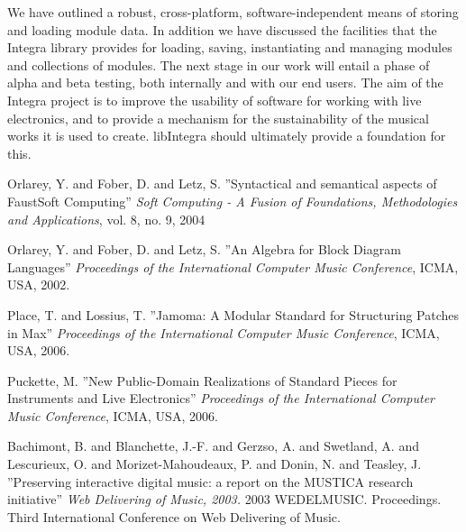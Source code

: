 \documentclass{article}
\begin{document}
We have outlined a robust, cross-platform, software-independent means of storing and loading module data. In addition we have discussed the facilities that the Integra library provides for loading, saving, instantiating and managing modules and collections of modules. The next stage in our work will entail a phase of alpha and beta testing, both internally and with our end users. The aim of the Integra project is to improve the usability of software for working with live electronics, and to provide a mechanism for the sustainability of the musical works it is used to create. libIntegra should ultimately provide a foundation for this.

\begin{thebibliography}{citations}

 Orlarey, Y. and Fober, D. and Letz, S.
''Syntactical and semantical aspects of FaustSoft Computing''
{\it Soft Computing - A Fusion of Foundations, Methodologies and Applications}, vol. 8, no. 9, 2004

 Orlarey, Y. and Fober, D. and Letz, S.
''An Algebra for Block Diagram Languages''
{\it Proceedings of the International Computer Music Conference}, ICMA, USA, 2002.

 Place, T. and Lossius, T.
''Jamoma: A Modular Standard for Structuring Patches in Max''
{\it Proceedings of the International Computer Music Conference}, ICMA, USA, 2006.

 Puckette, M.
''New Public-Domain Realizations of Standard Pieces for Instruments and
Live Electronics''
{\it Proceedings of the International Computer Music Conference}, ICMA, USA, 2006.

 Bachimont, B. and Blanchette, J.-F. and Gerzso, A. and Swetland, A. and Lescurieux, O. and Morizet-Mahoudeaux, P. and Donin, N. and Teasley, J.
''Preserving interactive digital music: a report on the MUSTICA research initiative''
{\it Web Delivering of Music, 2003.} 2003 WEDELMUSIC. Proceedings. Third International Conference on Web Delivering of Music.

\end{thebibliography}
\end{document}
